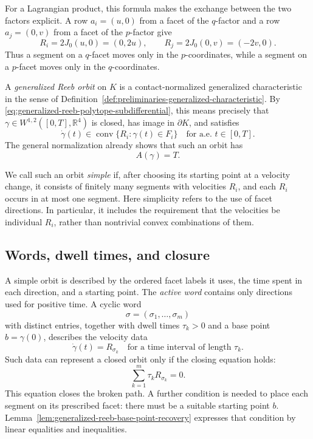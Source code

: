 For a Lagrangian product, this formula makes the exchange between the two
factors explicit.  A row \(a_i=(u,0)\) from a facet of the \(q\)-factor and a
row \(a_j=(0,v)\) from a facet of the \(p\)-factor give
\[
  R_i=2J_0(u,0)=(0,2u),
  \qquad
  R_j=2J_0(0,v)=(-2v,0).
\]
Thus a segment on a \(q\)-facet moves only in the \(p\)-coordinates, while a
segment on a \(p\)-facet moves only in the \(q\)-coordinates.

A \emph{generalized Reeb orbit} on \(K\) is a contact-normalized generalized
characteristic in the sense of
Definition~\ref{def:preliminaries-generalized-characteristic}.  By
\eqref{eq:generalized-reeb-polytope-subdifferential}, this means precisely that
\(\gamma\in W^{1,2}([0,T],\mathbb{R}^4)\) is closed, has image in
\(\partial K\), and satisfies
\begin{equation}\label{eq:generalized-reeb-inclusion}
  \dot{\gamma}(t)
  \in \operatorname{conv}\{R_i:\gamma(t)\in F_i\}
  \quad\text{for a.e. }t\in[0,T].
\end{equation}
The general normalization already shows that such an orbit has
\[
  A(\gamma)=T.
\]

We call such an orbit \emph{simple} if, after choosing its starting point
at a velocity change, it consists of finitely many segments with velocities
$R_i$, and each $R_i$ occurs in at most one segment. Here simplicity refers
to the use of facet directions. In particular, it includes the requirement
that the velocities be individual $R_i$, rather than nontrivial convex
combinations of them.

\subsection{Words, dwell times, and closure}
\label{subsec:generalized-reeb-orbits-polytopes-words}

A simple orbit is described by the ordered facet labels it uses, the time
spent in each direction, and a starting point. The \emph{active word}
contains only directions used for positive time. A cyclic word
\[
  \sigma=(\sigma_1,\ldots,\sigma_m)
\]
with distinct entries, together with dwell times \(\tau_k>0\) and a base point
\(b=\gamma(0)\), describes the velocity data
\[
  \dot{\gamma}(t)=R_{\sigma_k}
  \quad\text{for a time interval of length }\tau_k.
\]
Such data can represent a closed orbit only if the closing equation holds:
\begin{equation}\label{eq:generalized-reeb-closure}
  \sum_{k=1}^m \tau_k R_{\sigma_k}=0.
\end{equation}
This equation closes the broken path. A further condition is needed to
place each segment on its prescribed facet: there must be a suitable
starting point $b$. Lemma~\ref{lem:generalized-reeb-base-point-recovery}
expresses that condition by linear equalities and inequalities.


